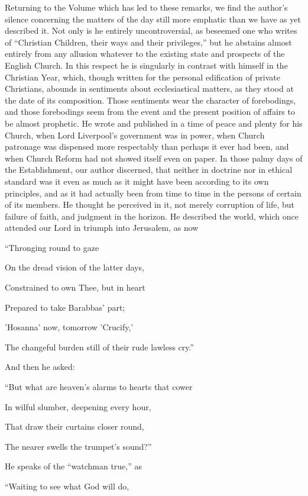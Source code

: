 Returning to the Volume which has led to these
remarks, we find the author's silence concerning the matters of the
day still more emphatic than we have as yet described it. Not only is
he entirely uncontroversial, as beseemed one who writes of ``Christian
Children, their ways and their privileges,'' but he abstains almost
entirely from any allusion whatever to the existing state and
prospects of the English Church. In this respect he is singularly in
contrast with himself in the Christian Year, which, though written for
the personal edification of private Christians, abounds in
sentiments about ecclesiastical matters, as they stood at the date of
its composition. Those sentiments wear the character of forebodings,
and those forebodings seem from the event and the present position of
affairs to be almost prophetic. He wrote and published in a time of
peace and plenty for his Church, when Lord Liverpool's government was
in power, when Church patronage was dispensed more respectably than
perhaps it ever had been, and when Church Reform had not showed itself
even on paper. In those palmy days of the Establishment, our author
discerned, that neither in doctrine nor in ethical standard was it
even as much as it might have been according to its own principles,
and as it had actually been from time to time in the persons of
certain of its members. He thought he perceived in it, not merely
corruption of life, but failure of faith, and judgment in the horizon.
He described the world, which once attended our Lord in triumph into
Jerusalem, as now

``Thronging round to gaze

On the dread vision of the latter days,

Constrained to own Thee, but in heart

Prepared to take Barabbas' part;

'Hosanna'
now, tomorrow 'Crucify,'

The changeful burden still of their rude lawless cry.''

And then he asked:

``But what
are heaven's alarms to hearts that cower

In wilful slumber, deepening every hour,

That draw their curtains closer round,

The nearer swells the trumpet's sound?''

He speaks of the ``watchman true,'' as

``Waiting
to see what God will do,

